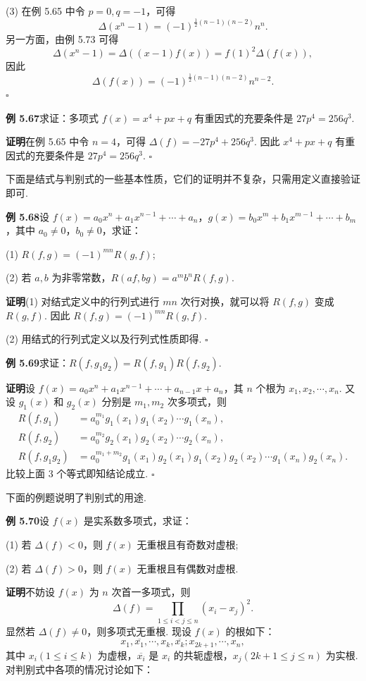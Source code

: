 \documentclass[UTF8, 12pt, fontset=fandol, oneside]{ctexart}
\begin{document}
(3) 在例 5.65 中令 $p=0,q=-1$，可得
\[
\Delta(x^n-1)=(-1)^{\frac12(n-1)(n-2)}n^n.
\]
另一方面，由例 5.73 可得
\[
\Delta(x^n-1)=\Delta((x-1)f(x))=f(1)^2\Delta(f(x)),
\]
因此
\[
\Delta(f(x))=(-1)^{\frac12(n-1)(n-2)}n^{n-2}.
\]
\hfill $\square$

\noindent\textbf{例 5.67}\quad 求证：多项式 $f(x)=x^4+px+q$ 有重因式的充要条件是 $27p^4=256q^3$.

\noindent\textbf{证明}\quad 在例 5.65 中令 $n=4$，可得 $\Delta(f)=-27p^4+256q^3$. 因此 $x^4+px+q$ 有重因式的充要条件是 $27p^4=256q^3$. \hfill $\square$

下面是结式与判别式的一些基本性质，它们的证明并不复杂，只需用定义直接验证即可.

\noindent\textbf{例 5.68}\quad 设 $f(x)=a_0x^n+a_1x^{n-1}+\cdots+a_n$，$g(x)=b_0x^m+b_1x^{m-1}+\cdots+b_m$，其中 $a_0\ne0$，$b_0\ne0$，求证：

(1) $R(f,g)=(-1)^{mn}R(g,f)$;

(2) 若 $a,b$ 为非零常数，$R(af,bg)=a^mb^nR(f,g)$.

\noindent\textbf{证明}\quad (1) 对结式定义中的行列式进行 $mn$ 次行对换，就可以将 $R(f,g)$ 变成 $R(g,f)$. 因此 $R(f,g)=(-1)^{mn}R(g,f)$.

(2) 用结式的行列式定义以及行列式性质即得. \hfill $\square$

\noindent\textbf{例 5.69}\quad 求证：$R(f,g_1g_2)=R(f,g_1)R(f,g_2)$.

\noindent\textbf{证明}\quad 设 $f(x)=a_0x^n+a_1x^{n-1}+\cdots+a_{n-1}x+a_n$，其 $n$ 个根为 $x_1,x_2,\cdots,x_n$. 又设 $g_1(x)$ 和 $g_2(x)$ 分别是 $m_1,m_2$ 次多项式，则
\[
\begin{aligned}
R(f,g_1)&=a_0^{m_1}g_1(x_1)g_1(x_2)\cdots g_1(x_n),\\
R(f,g_2)&=a_0^{m_2}g_2(x_1)g_2(x_2)\cdots g_2(x_n),\\
R(f,g_1g_2)&=a_0^{m_1+m_2}g_1(x_1)g_2(x_1)g_1(x_2)g_2(x_2)\cdots g_1(x_n)g_2(x_n).
\end{aligned}
\]
比较上面 3 个等式即知结论成立. \hfill $\square$

下面的例题说明了判别式的用途.

\noindent\textbf{例 5.70}\quad 设 $f(x)$ 是实系数多项式，求证：

(1) 若 $\Delta(f)<0$，则 $f(x)$ 无重根且有奇数对虚根;

(2) 若 $\Delta(f)>0$，则 $f(x)$ 无重根且有偶数对虚根.

\noindent\textbf{证明}\quad 不妨设 $f(x)$ 为 $n$ 次首一多项式，则
\[
\Delta(f)=\prod_{1\le i<j\le n}(x_i-x_j)^2.
\]
显然若 $\Delta(f)\ne0$，则多项式无重根. 现设 $f(x)$ 的根如下：
\[
x_1,\overline{x_1},\cdots,x_k,\overline{x_k};x_{2k+1},\cdots,x_n,
\]
其中 $x_i(1\le i\le k)$ 为虚根，$\overline{x_i}$ 是 $x_i$ 的共轭虚根，$x_j(2k+1\le j\le n)$ 为实根. 对判别式中各项的情况讨论如下：
\end{document}
